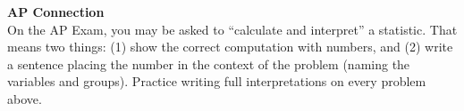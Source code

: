 \documentclass[10pt]{article}
\begin{document}
\vspace{0.14in}

\begin{tcolorbox}[colback=goldbox, colframe=navy, boxrule=0.8pt, arc=2mm,
    left=4mm, right=4mm, top=3mm, bottom=3mm]
\small\textbf{AP Connection}\\[4pt]
On the AP Exam, you may be asked to ``calculate and interpret'' a statistic. That means two
things: (1) show the correct computation with numbers, and (2) write a sentence placing the
number in the context of the problem (naming the variables and groups). Practice writing full
interpretations on every problem above.
\end{tcolorbox}
\end{document}
